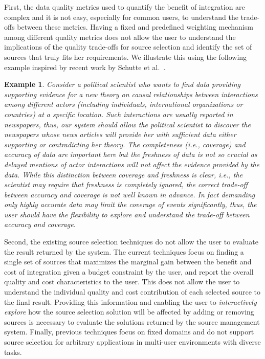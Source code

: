 \documentclass{sig-alternate}
\newtheorem{example}{Example}
\begin{document}
First, the data quality metrics used to quantify the benefit of integration are complex and it is not easy, especially for common users, to understand the trade-offs between these metrics. Having a fixed and predefined weighting mechanism among different quality metrics does not allow the user to understand the implications of the quality trade-offs for source selection and identify the set of sources that truly fits her requirements. We illustrate this using the following example inspired by recent work by Schutte et al.~\cite{schutte:2014}.
\vspace{-5pt}
\begin{example}
Consider a political scientist who wants to find data providing supporting evidence for a new theory on causal relationships between interactions among different actors (including individuals, international organizations or countries) at a specific location. Such interactions are usually reported in newspapers, thus, our system should allow the political scientist to discover the newspapers whose news articles will provide her with sufficient data either supporting or contradicting her theory. The completeness (i.e., coverage) and accuracy of data are important here but the freshness of data is not so crucial as delayed mentions of actor interactions will not affect the evidence provided by the data. While this distinction between coverage and freshness is clear, i.e., the scientist may require that freshness is completely ignored, the correct trade-off between accuracy and coverage is not well known in advance. In fact demanding only highly accurate data may limit the coverage of events significantly, thus, the user should have the flexibility to explore and understand the trade-off between accuracy and coverage. 
\end{example}
Second, the existing source selection techniques do not allow the user to evaluate the result returned by the system. The current techniques focus on finding a single set of sources that maximizes the marginal gain between the benefit and cost of integration given a budget constraint by the user, and report the overall quality and cost characteristics to the user. This does not allow the user to understand the individual quality and cost contribution of each selected source to the final result. Providing this information and enabling the user to {\em interactively explore} how the source selection solution will be affected by adding or removing sources is necessary to evaluate the solutions returned by the source management system. Finally, previous techniques focus on fixed domains and do not support source selection for arbitrary applications in multi-user environments with diverse tasks.  
\end{document}
